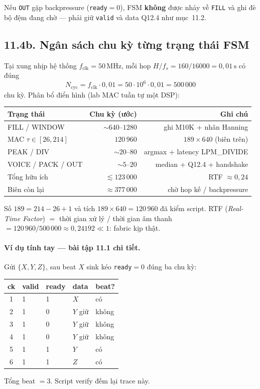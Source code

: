 Nếu \texttt{OUT} gặp backpressure (\texttt{ready}$=0$), FSM \textbf{không} được nhảy về \texttt{FILL} và ghi đè bộ đệm đang chờ --- phải giữ \texttt{valid} và data Q12.4 như mục~11.2.

\subsection*{11.4b. Ngân sách chu kỳ từng trạng thái FSM}

Tại xung nhịp hệ thống $f_{\mathrm{clk}}=50\,\text{MHz}$, mỗi hop $H/f_s=160/16000=0{,}01\,\text{s}$ có đúng
\[
N_{\mathrm{cyc}}=f_{\mathrm{clk}}\cdot 0{,}01=50\cdot 10^6\cdot 0{,}01=500\,000
\]
chu kỳ. Phân bổ điển hình (lab MAC tuần tự một DSP):
\begin{center}\small
\begin{tabular}{@{}lrr@{}}\toprule
Trạng thái & Chu kỳ (ước) & Ghi chú \\
\midrule
FILL / WINDOW & $\sim 640$--$1280$ & ghi M10K + nhân Hanning \\
MAC $\tau\in[26,214]$ & $120\,960$ & $189\times 640$ (biên trên) \\
PEAK / DIV & $\sim 20$--$80$ & argmax + latency LPM\_DIVIDE \\
VOICE / PACK / OUT & $\sim 5$--$20$ & median + Q12.4 + handshake \\
\midrule
Tổng hữu ích & $\lesssim 123\,000$ & RTF $\approx 0{,}24$ \\
Biên còn lại & $\approx 377\,000$ & chờ hop kế / backpressure \\
\bottomrule
\end{tabular}
\end{center}
Số $189=214-26+1$ và tích $189\times 640=120\,960$ đã kiểm script. RTF (\emph{Real-Time Factor}) $=$ thời gian xử lý / thời gian âm thanh $=120\,960/500\,000\approx 0{,}24192\ll 1$: fabric kịp thật.

\paragraph{Ví dụ tính tay --- bài tập 11.1 chi tiết.} Gửi $\{X,Y,Z\}$, sau beat $X$ sink kéo \texttt{ready}$=0$ đúng ba chu kỳ:
\begin{center}\small
\begin{tabular}{@{}cllll@{}}\toprule
ck & valid & ready & data & beat? \\
\midrule
1 & 1 & 1 & $X$ & có \\
2 & 1 & 0 & $Y$ giữ & không \\
3 & 1 & 0 & $Y$ giữ & không \\
4 & 1 & 0 & $Y$ giữ & không \\
5 & 1 & 1 & $Y$ & có \\
6 & 1 & 1 & $Z$ & có \\
\bottomrule
\end{tabular}
\end{center}
Tổng beat $=3$. Script verify đếm lại trace này.


